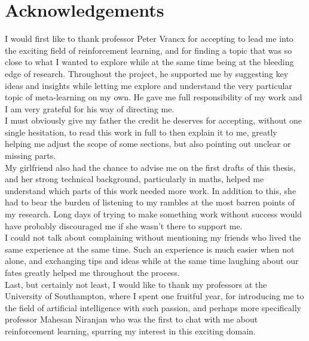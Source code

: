 \documentclass[11pt,a4paper,twoside,openright]{book}
\begin{document}
\medskip


\chapter*{Acknowledgements}
\thispagestyle{empty} 

\noindent I would first like to thank professor Peter Vrancx for accepting
to lead me into the exciting field of reinforcement learning, and for finding
a topic that was so close to what I wanted to explore while at the same
time being at the bleeding edge of research. Throughout the project, he
supported me by suggesting key ideas and insights while letting me explore
and understand the very particular topic of meta-learning on my own. He
gave me full responsibility of my work and I am very grateful for his way 
of directing me.\\

I must obviously give my father the credit he deserves for accepting, without
one single hesitation, to read this work in full to then explain it to me,
greatly helping me adjust the scope of some sections, but also pointing out
unclear or missing parts.\\

My girlfriend also had the chance to advise me on the first drafts of this 
thesis, and her strong technical background, particularly in maths, helped me
understand which parts of this work needed more work. In addition to this, she 
had to bear the burden of listening to my rambles at
the most barren points of my research. Long days of trying to make something
work without success would have probably discouraged me if she wasn't there
to support me.\\

I could not talk about complaining without mentioning my friends who lived the
same experience at the same time. Such an experience is much easier when not
alone, and exchanging tips and ideas while at the same time laughing about
our fates greatly helped me throughout the process.\\

Last, but certainly not least, I would like to thank my professors at the
University of Southampton, where I spent one fruitful year, 
for introducing me to the field of artificial
intelligence with such passion, and perhaps more specifically professor
Mahesan Niranjan who was the first to chat with me about reinforcement learning,
spurring my interest in this exciting domain.
\end{document}
